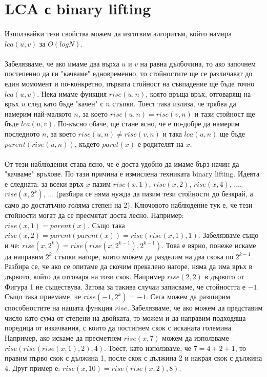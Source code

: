 \documentclass[12pt]{article}
\begin{document}
\section*{LCA с binary lifting}
\paragraph*{}
Използвайки тези свойства можем да изготвим алгоритъм, който намира $lca(u, v)$ за $O(logN)$. 
\paragraph*{}
Забелязваме, че ако имаме два върха $u$ и $v$ на равна дълбочина, то ако започнем постепенно да ги "качваме" едновременно, то стойностите ще се различават до един момомент и по-конкретно, първата стойност на съвпадение ще бъде точно $lca(u, v)$. Нека имаме функция $rise(u, n)$, която връща връх, отговарящ на връх $u$ след като бъде "качен" с $n$ стъпки. Тоест така излиза, че трябва да намерим най-малкото $n$, за което $rise(u, n) = rise(v, n)$ и тази стойност ще бъде $lca(u, v)$. По-късно обаче, ще стане ясно, че е по-добре да намерим последното $n$, за което $rise(u, n) \neq rise(v, n)$ и така $lca(u, n)$ ще бъде $parent(rise(u, n))$, където $paret(x)$ е родителят на $x$.
\paragraph*{}
От тези наблюдения става ясно, че е доста удобно да имаме бърз начин да "качваме" връхове. По тази причина е измислена техниката binary lifting. Идеята е следната: за всеки връх $x$ пазим $rise(x, 1)$, $rise(x, 2)$, $rise(x, 4)$, ..., $rise(x, 2^k)$, ... (разбира се няма нужда да пазим тези стойности до безкрай, а само до достатъчно голяма степен на 2). Ключовото наблюдение тук е, че тези стойности могат да се пресмятат доста лесно. Например: $rise(x, 1) = parent(x)$. Също така $rise(x, 2) = parent(parent(x)) = rise(rise(x, 1), 1)$. Забелязваме също и че: $rise(x, 2^k) = rise(rise(x, 2^{k-1}), 2^{k-1})$. Това е вярно, понеже искаме да направим $2^k$ стъпки нагоре, които можем да разделим на два скока по $2^{k-1}$. Разбира се, че ако се опитаме да скочим прекалено нагоре, няма да има връх в дървото, който да отговаря на този скок. Например $rise(2, 2)$ в дървото от Фигура 1 не съществува. Затова за такива случаи записваме, че стойността е $-1$. Също така приемаме, че $rise(-1, 2^k) = -1$.  Сега можем да разширим способностите на нашата функция $rise$. Забелязваме, че ако можем да представим число като сума от степени на двойката, то можем и да направим подходяща поредица от изкачвания, с които да постигнем скок с исканата големина. Например, ако искаме да пресметнем $rise(x, 7)$ можем да използваме $rise(rise(rise(x, 1), 2), 4)$. Тоест, като използваме, че $7=4+2+1$, то правим първо скок с дължина 1, после скок с дължина 2 и накрая скок с дължина 4. Друг пример е: $rise(x, 10) = rise(rise(x, 2), 8)$.
\end{document}
